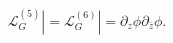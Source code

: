 \begin{equation}\label{Free}
{\mathcal L}_G^{(5)} |={\mathcal L}_G^{(6)} |=
 \partial_z\phi \partial_{\bar z}\phi.
\end{equation}

